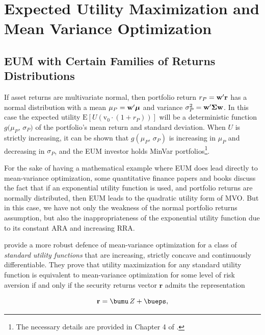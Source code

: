\documentclass[graybox,envcountchap,sectrefs]{svmono}\usepackage[]{graphicx}\usepackage[]{xcolor}
\begin{document}
\begin{appendices}
\smallskip{}

\textbf{\large{}}{\large\par}

\section{Expected Utility Maximization and Mean Variance Optimization}

\subsection*{EUM with Certain Families of Returns Distributions}

If asset returns are multivariate normal, then portfolio return $r_{P}={\bf w^{\mathrm{\prime}}r}$
has a normal distribution with a mean $\mu_{P}={\bf w^{\prime}\boldsymbol{\mu}}$
and variance $\sigma_{P}^{2}={\bf w^{\prime}}\boldsymbol{\boldsymbol{\Sigma}}{\bf w}$.
In this case the expected utility $\mathrm{E}\left[U\left(\mathrm{v}_{0}\cdot(1+r_{P})\right)\right]$
will be a deterministic function $g($$\mu_{P},\,\sigma_{P})$ of
the portfolio's mean return and standard deviation. When $U$ is strictly
increasing, it can be shown that $g(\mu_{P},\,\sigma_{P})$ is increasing
in $\mu_{P}$ and decreasing in $\sigma_{P}$, and the EUM investor
holds MinVar portfolios\footnote{The necessary details are provided in Chapter 4 of \citet{Ingersoll1987}.}. 

For the sake of having a mathematical example where EUM does lead
directly to mean-variance optimization, some quantitative finance
papers and books discuss the fact that if an exponential utility function
is used, and portfolio returns are normally distributed, then EUM
leads to the quadratic utility form of MVO. But in this case, we have
not only the weakness of the normal portfolio returns assumption,
but also the inappropriateness of the exponential utility function
due to its constant ARA and increasing RRA.

\citet{BenvenisteKolmRitter2024} provide a more robust defence of
mean-variance optimization for a class of \emph{standard utility functions}
that are increasing, strictly concave and continuously differentiable.
They prove that utility maximization for any standard utility function
is equivalent to mean-variance optimization for some level of risk
aversion if and only if the security returns vector $\mathbf{r}$
admits the representation 

\begin{equation}
\mathbf{r}=\bumu\,Z+\bueps,\label{eq:rRepresenation}
\end{equation}


\end{appendices}
\end{document}
